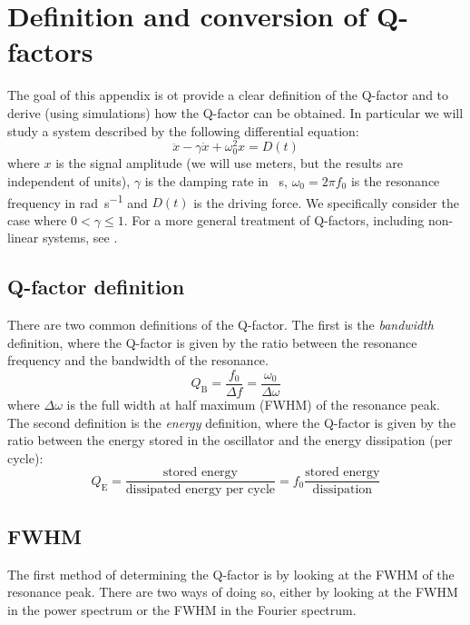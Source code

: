 \chapter{Definition and conversion of Q-factors}
\label{app:q_factors}

The goal of this appendix is ot provide a clear definition of the Q-factor and to derive (using simulations) how the Q-factor can be obtained. In particular we will study a system described by the following differential equation:
\begin{equation}
    \ddot{x} - \gamma \dot{x} + \omega_0^2 x = D(t)
    \tag{damped h.o.}
\end{equation}
where $x$ is the signal amplitude (we will use meters, but the results are independent of units), $\gamma$ is the damping rate in \unit{\per\second}, $\omega_0 = 2\pi f_0$ is the resonance frequency in \unit{\radian\per\second} and $D(t)$ is the driving force. We specifically consider the case where $0 < \gamma \leq 1$. For a more general treatment of Q-factors, including non-linear systems, see \citeauthor{wang_rigorous_2017}.

\section{Q-factor definition}
There are two common definitions of the Q-factor. The first is the \textit{bandwidth} definition, where the Q-factor is given by the ratio between the resonance frequency and the bandwidth of the resonance.
\begin{equation}
    Q_\text{B} = \frac{f_0}{\Delta f} = \frac{\omega_0}{\Delta \omega}
    \tag{bandwidth definition}
\end{equation}
where $\Delta \omega$ is the full width at half maximum (FWHM) of the resonance peak. The second definition is the \textit{energy} definition, where the Q-factor is given by the ratio between the energy stored in the oscillator and the energy dissipation (per cycle):
\begin{equation}
    Q_\text{E} = \frac{\text{stored energy}}{\text{dissipated energy per cycle}} = f_0 \frac{\text{stored energy}}{\text{dissipation}}
    \tag{energy definition}
\end{equation}

\section{FWHM}
The first method of determining the Q-factor is by looking at the FWHM of the resonance peak. There are two ways of doing so, either by looking at the FWHM in the power spectrum or the FWHM in the Fourier spectrum.

